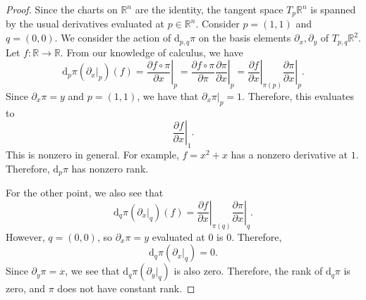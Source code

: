 \documentclass[11pt, letterpaper]{article}
\theoremstyle{plain}
\begin{document}
\begin{proof}
	Since the charts on $\mathbb{R} ^n$ are the identity, the tangent space $T_p\mathbb{R} ^n$ is spanned by the usual derivatives evaluated at $p\in\mathbb{R} ^n$. Consider $p=(1,1)$ and $q=(0,0)$. We consider the action of $\mathrm{d}_{p,q} \pi $ on the basis elements $\partial _x,\partial _y$ of $T_{p,q} \mathbb{R} ^2$. Let $f : \mathbb{R} \to \mathbb{R} $. From our knowledge of calculus, we have
	\[
		\mathrm{d}_p\pi (\partial_x|_p)(f)=\left.\frac{\partial f\circ \pi }{\partial x} \right|_p=\left. \frac{\partial f\circ \pi }{\partial \pi } \frac{\partial \pi }{\partial x} \right|_p=\left.\frac{\partial f}{\partial x} \right|_{\pi (p)} \left.\frac{\partial \pi }{\partial x} \right|_p
	.\]
	Since $\partial_x\pi =y$ and $p=(1,1)$, we have that $\partial_x\pi |_p=1$. Therefore, this evaluates to
	\[
		\left.\frac{\partial f}{\partial x} \right|_{1} 
	.\]
	This is nonzero in general. For example, $f=x^2+x$ has a nonzero derivative at $1$. Therefore, $\mathrm{d} _p\pi $ has nonzero rank.

	For the other point, we also see that
	\[
		\mathrm{d}_q\pi (\partial _x|_q)(f)=\left. \frac{\partial f}{\partial x} \right|_{\pi (q)} \left.\frac{\partial \pi }{\partial x} \right|_q
	.\]
	However, $q=(0,0)$, so $\partial_x\pi =y$ evaluated at $0$ is $0$. Therefore,
	\[
		\mathrm{d}_q\pi (\partial _x|_q)=0
	.\]
	Since $\partial _y\pi =x$, we see that $\mathrm{d}_q\pi (\partial _y|_q)$ is also zero. Therefore, the rank of $\mathrm{d}_q\pi $ is zero, and $\pi $ does not have constant rank.
\end{proof}
\end{document}
